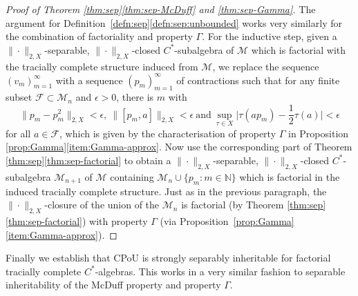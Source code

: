 \documentclass[a4paper,11pt]{amsart}
\theoremstyle{definition}
\numberwithin{equation}{section}
\numberwithin{theorem}{section}
\begin{document}
\begin{proof}[Proof of Theorem \ref{thm:sep}\ref{thm:sep-McDuff} and \ref{thm:sep-Gamma}]
 The argument for Definition~\ref{defn:sep}\ref{defn:sep:unbounded} works very similarly for the combination of factoriality and property $\Gamma$. For the inductive step, given a $\|\cdot\|_{2,X}$-separable, $\|\cdot\|_{2,X}$-closed $C^*$-subalgebra of $\mathcal M$ which is factorial with the tracially complete structure induced from $\mathcal M$, we replace the sequence $(v_m)_{m=1}^\infty$ with a sequence $(p_m)_{m=1}^\infty$ of contractions such that for any finite subset $\mathcal F\subset\mathcal M_n$ and $\epsilon>0$, there is $m$ with 
 	\begin{equation}
		\|p_m - p_m^2 \|_{2, X}<\epsilon,\ \|[p_m, a]\|_{2, X}<\epsilon\ \text{and}\ \sup_{\tau\in X}\big|\tau(ap_m) - \frac12 \tau(a)\big|<\epsilon
	\end{equation}
 for all $a\in \mathcal F$, which is given by the characterisation of property $\Gamma$ in Proposition \ref{prop:Gamma}\ref{item:Gamma-approx}. Now use the corresponding part of Theorem \ref{thm:sep}\ref{thm:sep-factorial} to obtain a $\|\cdot\|_{2,X}$-separable, $\|\cdot\|_{2,X}$-closed $C^*$-subalgebra $\mathcal M_{n+1}$ of $\mathcal M$ containing $\mathcal M_{n}\cup\{p_m:m\in\mathbb N\}$ which is factorial in the induced tracially complete structure.  Just as in the previous paragraph, the $\|\cdot\|_{2,X}$-closure of the union of the $\mathcal M_n$ is factorial (by Theorem \ref{thm:sep}\ref{thm:sep-factorial}) with property $\Gamma$ (via Proposition~\ref{prop:Gamma}\ref{item:Gamma-approx}).
\end{proof}

Finally we establish that CPoU is strongly separably inheritable for factorial tracially complete $C^*$-algebras.  This works in a very similar fashion to separable inheritability of the McDuff property and property $\Gamma$.
\end{document}
